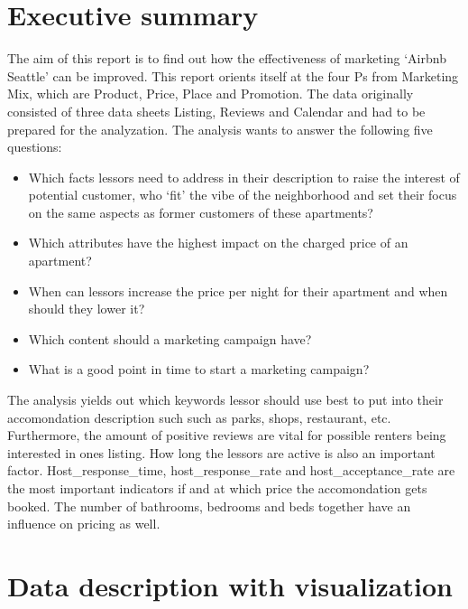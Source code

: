 \documentclass[journal]{IEEEtran}
\begin{document}
\section{Executive summary} 
\noindent The aim of this report is to find out how the effectiveness of marketing ‘Airbnb Seattle’ can be improved. This report orients itself at the four Ps from Marketing Mix, which are Product, Price, Place and Promotion. 
The data originally consisted of three data sheets Listing, Reviews and Calendar and had to be prepared for the analyzation. 
The analysis wants to answer the following five questions: 
\begin{itemize}
\item Which facts lessors need to address in their description to raise the interest of potential customer, who ‘fit’ the vibe of the neighborhood and set their focus on the same aspects as former customers of these apartments?
\item Which attributes have the highest impact on the charged price of an apartment?
\item When can lessors increase the price per night for their apartment and when should they lower it?
\item Which content should a marketing campaign have?
\item What is a good point in time to start a marketing campaign?
\end{itemize}
The analysis yields out  which keywords lessor should use best to put into their accomondation description such such as parks, shops, restaurant, etc.
Furthermore, the amount of positive reviews are vital for possible renters being interested in ones listing. How long the lessors are active is also an important factor. 
Host\_response\_time, host\_response\_rate and host\_acceptance\_rate are the most important indicators if and at which price the accomondation gets booked. The number of bathrooms, bedrooms and beds together have an influence on pricing as well. 
%
%
\section{Data description with visualization}
\end{document}
